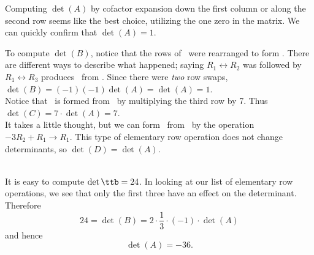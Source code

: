 {
Computing $\det(A)$ by cofactor expansion down the first column or along the second row seems like the best choice, utilizing the one zero in the matrix. We can quickly confirm that $\det(A) = 1$. 

To compute $\det(B)$, notice that the rows of \tta\ were rearranged to form \ttb. There are different ways to describe what happened; saying $R_1\leftrightarrow R_2$ was followed by $R_1\leftrightarrow R_3$ produces \ttb\ from \tta. Since there were \textit{two} row swaps, $\det(B) = (-1)(-1)\det(A) = \det(A) = 1$.\\ 

Notice that \ttc\ is formed from \tta\ by multiplying the third row by 7. Thus $\det(C) = 7\cdot\det(A) = 7$.\\

It takes a little thought, but we can form \ttd\ from \tta\ by the operation $-3R_2+R_1\rightarrow R_1$. This type of elementary row operation does not change determinants, so $\det(D) = \det(A)$.
}\\

{
It is easy to compute $\det\ttb=24$. In looking at our list of elementary row operations, we see that only the first three have an effect on the determinant. Therefore 
\[
24 = \det(B) = 2\cdot \frac13  \cdot (-1)\cdot \det(A)
\]
and hence 
\[
\det(A) = -36.
\]
} 

